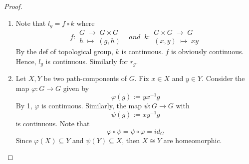 \begin{proof}
    \begin{enumerate}
        \item Note that $l_g = f \circ k$ where
        $$f: \substack{G \;\to\; G\times G\\
        h \;\mapsto\; (g,h)} \;\;\: and\;\; k: \substack{G \times G \;\to\; G\\
        (x,y) \;\mapsto\; xy}$$
        By the def of topological group, $k$ is continuous. $f$ is obviously continuous. Hence, $l_g$ is continuous. Similarly for $r_g$.

        \item Let $X,Y$ be two path-components of $G$. Fix $x \in X$ and $y \in Y$. Consider the map $\varphi: G \to G$ given by
        $$\varphi(g) := yx^{-1}g$$
        By 1, $\varphi$ is continuous. Similarly, the map $\psi: G \to G$ with
        $$\psi(g) := xy^{-1}g$$
        is continuous. Note that
        $$\varphi \circ \psi = \psi \circ \varphi = id_G$$
        Since $\varphi(X) \subseteq Y$ and $\psi(Y) \subseteq X$, then $X \cong Y$ are homeomorphic.
    \end{enumerate}
\end{proof}